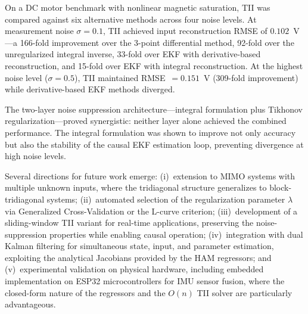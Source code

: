 \documentclass[lettersize,journal]{IEEEtran}
\begin{document}
On a DC motor benchmark with nonlinear magnetic saturation, TII was compared against six alternative methods across four noise levels. At measurement noise $\sigma = 0.1$, TII achieved input reconstruction RMSE of $0.102$~V---a 166-fold improvement over the 3-point differential method, 92-fold over the unregularized integral inverse, 33-fold over EKF with derivative-based reconstruction, and 15-fold over EKF with integral reconstruction. At the highest noise level ($\sigma = 0.5$), TII maintained RMSE~$= 0.151$~V (309-fold improvement) while derivative-based EKF methods diverged.

The two-layer noise suppression architecture---integral formulation plus Tikhonov regularization---proved synergistic: neither layer alone achieved the combined performance. The integral formulation was shown to improve not only accuracy but also the stability of the causal EKF estimation loop, preventing divergence at high noise levels.

Several directions for future work emerge: (i)~extension to MIMO systems with multiple unknown inputs, where the tridiagonal structure generalizes to block-tridiagonal systems; (ii)~automated selection of the regularization parameter $\lambda$ via Generalized Cross-Validation or the L-curve criterion; (iii)~development of a sliding-window TII variant for real-time applications, preserving the noise-suppression properties while enabling causal operation; (iv)~integration with dual Kalman filtering for simultaneous state, input, and parameter estimation, exploiting the analytical Jacobians provided by the HAM regressors; and (v)~experimental validation on physical hardware, including embedded implementation on ESP32 microcontrollers for IMU sensor fusion, where the closed-form nature of the regressors and the $O(n)$ TII solver are particularly advantageous.
\end{document}
